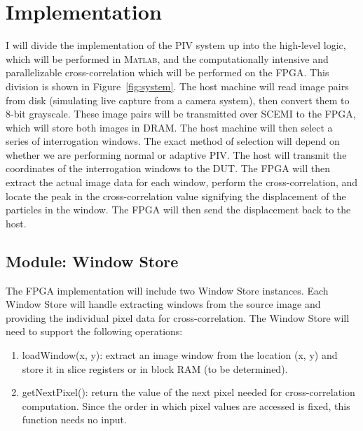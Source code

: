 \documentclass{article}
\begin{document}
	\section{Implementation}
	I will divide the implementation of the PIV system up into the high-level logic, which will be performed in \textsc{Matlab}, and the computationally intensive and parallelizable cross-correlation which will be performed on the FPGA. This division is shown in Figure~\ref{fig:system}. The host machine will read image pairs from disk (simulating live capture from a camera system), then convert them to 8-bit grayscale. These image pairs will be transmitted over SCEMI to the FPGA, which will store both images in DRAM. The host machine will then select a series of interrogation windows. The exact method of selection will depend on whether we are performing normal or adaptive PIV. The host will transmit the coordinates of the interrogation windows to the DUT. The FPGA will then extract the actual image data for each window, perform the cross-correlation, and locate the peak in the cross-correlation value signifying the displacement of the particles in the window. The FPGA will then send the displacement back to the host. 

	\subsection{Module: Window Store}
	The FPGA implementation will include two Window Store instances. Each Window Store will handle extracting windows from the source image and providing the individual pixel data for cross-correlation. The Window Store will need to support the following operations: 

	\begin{enumerate}
		\item loadWindow(x, y): extract an image window from the location (x, y) and store it in slice registers or in block RAM (to be determined).
		\item getNextPixel(): return the value of the next pixel needed for cross-correlation computation. Since the order in which pixel values are accessed is fixed, this function needs no input.
	\end{enumerate}
\end{document}
